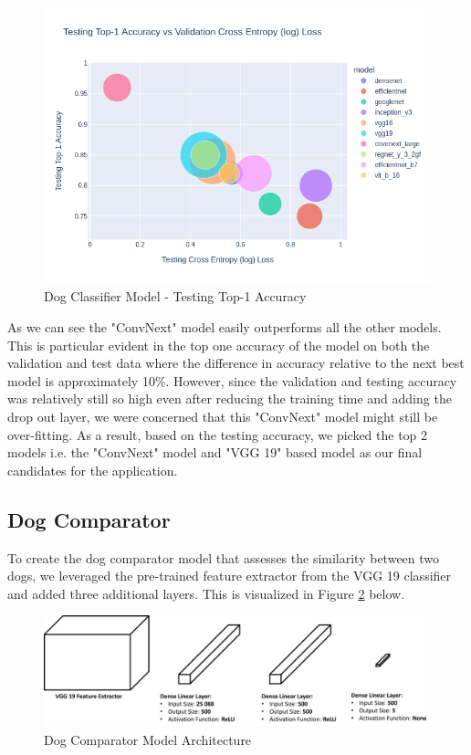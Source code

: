 \documentclass{article}
\begin{document}
\newpage

\begin{figure}[h]
\centering
	\includegraphics[scale=0.60]{final-report-images/test_accuracy_comp_fig.png}
\caption{Dog Classifier Model - Testing Top-1 Accuracy}
\label{fig:model2 testing accuracy}
\end{figure}

As we can see the "ConvNext" model easily outperforms all the other models.  This is particular evident in the top one accuracy of the model on both the validation and test data where the difference in accuracy relative to the next best model is approximately 10\%.  However, since the validation and testing accuracy was relatively still so high even after reducing the training time and adding the drop out layer, we were concerned that this "ConvNext" model might still be over-fitting. 
As a result, based on the testing accuracy, we picked the top 2 models i.e. the  "ConvNext" model and "VGG 19" based model as our final candidates for the application.


\newpage




\subsection{Dog Comparator}
To create the dog comparator model that assesses the similarity between two dogs, we leveraged the pre-trained feature extractor from the VGG 19 classifier \cite{SimonyanKaren2014VDCN} and added three additional layers.  This is visualized in Figure \ref{fig:x comparator} below.

\begin{figure}[h]
\centering
	\includegraphics[scale=0.4]{final-report-images/dog_comparator.png}
\caption{Dog Comparator Model Architecture}
\label{fig:x comparator}
\end{figure}
\end{document}
